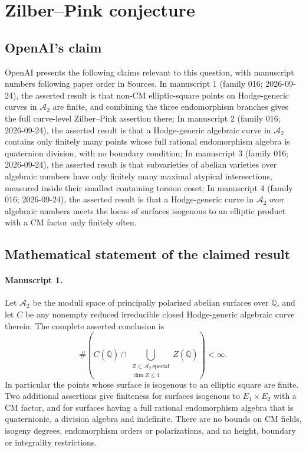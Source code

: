 \documentclass[11pt]{article}
\begin{document}
\section*{Zilber–Pink conjecture}

\subsection{OpenAI's claim}
OpenAI presents the following claims relevant to this question, with manuscript numbers following paper order in Sources. In manuscript 1 (family 016; 2026-09-24), the asserted result is that non-CM elliptic-square points on Hodge-generic curves in $\mathcal A_2$ are finite, and combining the three endomorphism branches gives the full curve-level Zilber--Pink assertion there; In manuscript 2 (family 016; 2026-09-24), the asserted result is that a Hodge-generic algebraic curve in $\mathcal A_2$ contains only finitely many points whose full rational endomorphism algebra is quaternion division, with no boundary condition; In manuscript 3 (family 016; 2026-09-24), the asserted result is that subvarieties of abelian varieties over algebraic numbers have only finitely many maximal atypical intersections, measured inside their smallest containing torsion coset; In manuscript 4 (family 016; 2026-09-24), the asserted result is that a Hodge-generic curve in $\mathcal A_2$ over algebraic numbers meets the locus of surfaces isogenous to an elliptic product with a CM factor only finitely often.

\subsection{Mathematical statement of the claimed result}
\paragraph{Manuscript 1.}
Let $\mathcal A_2$ be the moduli space of principally polarized abelian surfaces over $\overline{\mathbb Q}$, and let $C$ be any nonempty reduced irreducible closed Hodge-generic algebraic curve therein. The complete asserted conclusion is
\[
 \#\left(C(\overline{\mathbb Q})\cap
 \bigcup_{\substack{Z\subset\mathcal A_2\ \mathrm{special}\\\dim Z\le1}}
 Z(\overline{\mathbb Q})\right)<\infty.
\]
In particular the points whose surface is isogenous to an elliptic square are finite. Two additional assertions give finiteness for surfaces isogenous to $E_1\times E_2$ with a CM factor, and for surfaces having a full rational endomorphism algebra that is quaternionic, a division algebra and indefinite. There are no bounds on CM fields, isogeny degrees, endomorphism orders or polarizations, and no height, boundary or integrality restrictions.
\end{document}
